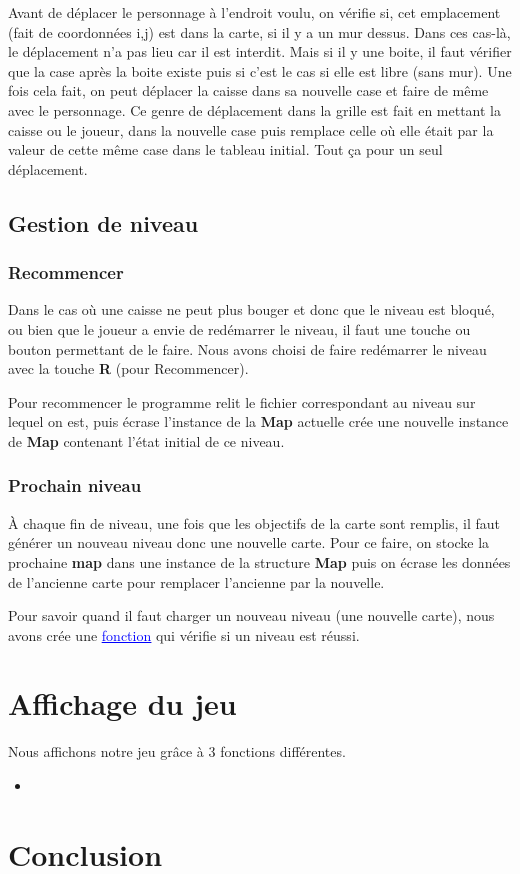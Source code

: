 \documentclass[french, 12pt]{article}
\begin{document}
       Avant de déplacer le personnage à l'endroit voulu, on vérifie si, cet emplacement (fait de coordonnées i,j) est dans la carte, si il y a un mur dessus. Dans ces cas-là, le déplacement n'a pas lieu car il est interdit. Mais si il y une boite, il faut vérifier que la case après la boite existe puis si c'est le cas si elle est libre (sans mur). Une fois cela fait, on peut déplacer la caisse dans sa nouvelle case et faire de même avec le personnage. Ce genre de déplacement dans la grille est fait en mettant la caisse ou le joueur, dans la nouvelle case puis remplace celle où elle était par la valeur de cette même case dans le tableau initial.
       Tout ça pour un seul déplacement.


   \subsection{Gestion de niveau}
       \subsubsection{Recommencer}
       Dans le cas où une caisse ne peut plus bouger et donc que le niveau est bloqué, ou bien que le joueur a envie de redémarrer le niveau, il faut une touche ou bouton permettant de le faire.
       Nous avons choisi de faire redémarrer le niveau avec la touche \textbf{R} (pour Recommencer).

       Pour recommencer le programme relit le fichier correspondant au niveau sur lequel on est, puis écrase l'instance de la \textbf{Map} actuelle crée une nouvelle instance de \textbf{Map} contenant l'état initial de ce niveau.


       \subsubsection{Prochain niveau}


       À chaque fin de niveau, une fois que les objectifs de la carte sont remplis, il faut générer un nouveau niveau donc une nouvelle carte.
       Pour ce faire, on stocke la prochaine \textbf{map} dans une instance de la structure \textbf{Map} puis on écrase les données de l'ancienne carte pour remplacer l'ancienne par la nouvelle.

       Pour savoir quand il faut charger un nouveau niveau (une nouvelle carte), nous avons crée une \href{../doc/html/move_8h.html}{\textcolor{blue}{\underline{fonction}}} qui vérifie si un niveau est réussi.



\section{Affichage du jeu}


Nous affichons notre jeu grâce à 3 fonctions différentes.
\begin{itemize}
    \item 
\end{itemize}


\section{Conclusion}
\end{document}
